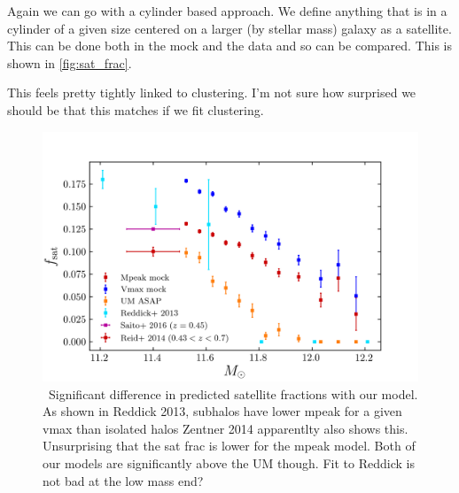 \documentclass{article}
\begin{document}
Again we can go with a cylinder based approach. We define anything that is in a cylinder of a given size centered on a larger (by stellar mass) galaxy as a satellite. This can be done both in the mock and the data and so can be compared. This is shown in \autoref{fig:sat_frac}.

This feels pretty tightly linked to clustering. I'm not sure how surprised we should be that this matches if we fit clustering.


\begin{figure}[h]
    \includegraphics[width=\textwidth]{images/sat_frac.png}
    \caption{\
        Significant difference in predicted satellite fractions with our model. As shown in Reddick 2013, subhalos have lower mpeak for a given vmax than isolated halos Zentner 2014 apparentlty also shows this. Unsurprising that the sat frac is lower for the mpeak model.
        Both of our models are significantly above the UM though.
        Fit to Reddick is not bad at the low mass end?
    \label{fig:sat_frac}
}
\end{figure}
\end{document}
